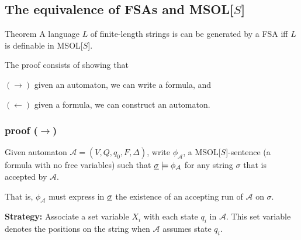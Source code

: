 \documentclass{beamer}
\begin{document}
\subsection{The equivalence of FSAs and MSOL[$S$]}
\begin{frame}
\begin{block}{Theorem}
A language $L$ of finite-length strings is can be generated by a FSA
iff 
$L$ is definable in MSOL[$S$].
\end{block}
\pause

The proof consists of showing that

$(\rightarrow)$ given an automaton, we can write a formula, and 

$(\leftarrow)$ given a formula, we can construct an automaton.

\end{frame}

\subsubsection{proof ($\rightarrow$)}
\begin{frame}
Given automaton $\mathcal{A}=(V,Q,q_0,F,\Delta)$, write $\phi_{\mathcal{A}}$, a MSOL[$S$]-sentence (a formula with no free variables) such that $\uline{\sigma}\models\phi_{\mathcal{A}}$ for any string $\sigma$ that is accepted by $\mathcal{A}$.

\pause 
That is, $\phi_{\mathcal{A}}$ must express in $\uline{\sigma}$ the existence of an accepting run of $\mathcal A$ on $\sigma$. 

\pause
\textbf{Strategy:} Associate a set variable $X_i$ with each state $q_i$ in $\mathcal A$.  This set variable denotes the positions on the string when $\mathcal A$ assumes state $q_i$. 
\end{frame}
\end{document}
